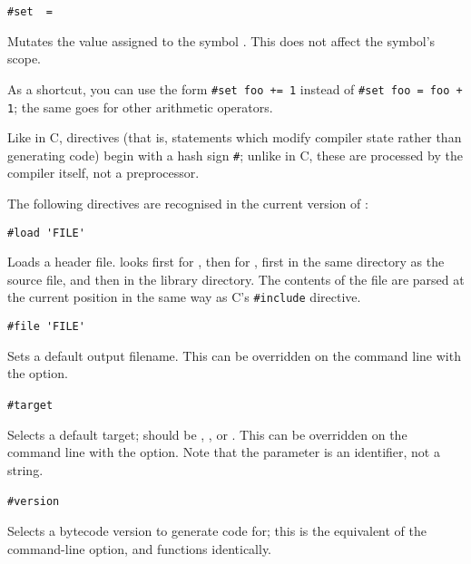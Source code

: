     \lstinline|#set|~~\lstinline|=|~
    \begin{cmdesc}
      Mutates the value assigned to the symbol .  This does not
      affect the symbol's scope.

      As a shortcut, you can use the form \lstinline|#set foo += 1| instead of
      \lstinline|#set foo = foo + 1|; the same goes for other arithmetic operators.
    \end{cmdesc}

  \label{sec:directives}

    Like in C, directives (that is, statements which modify compiler state
    rather than generating code) begin with a hash sign \lstinline|#|; unlike in
    C, these are processed by the compiler itself, not a preprocessor.

    \smallskip
    The following directives are recognised in the current version of \compiler:

    \lstinline|#load 'FILE'|
    \begin{cmdesc}
      Loads a header file.  \compiler{} looks first for , then for
      , first in the same directory as the source file,
      and then in the \package{} library directory.  The contents of the file are
      parsed at the current position in the same way as C's \lstinline|#include|
      directive.
    \end{cmdesc}

    \lstinline|#file 'FILE'|
    \begin{cmdesc}
      Sets a default output filename.  This can be overridden on the \compiler{}
      command line with the  option.
    \end{cmdesc}

    \lstinline|#target|~
    \begin{cmdesc}
      Selects a default target;  should be ,
      , or .  This can be overridden on the \compiler{}
      command line with the  option.  Note that the parameter is an
      identifier, not a string.
    \end{cmdesc}

    \lstinline|#version|~
    \begin{cmdesc}
      Selects a bytecode version to generate code for; this is the equivalent of
      the  command-line option, and functions identically.
    \end{cmdesc}

